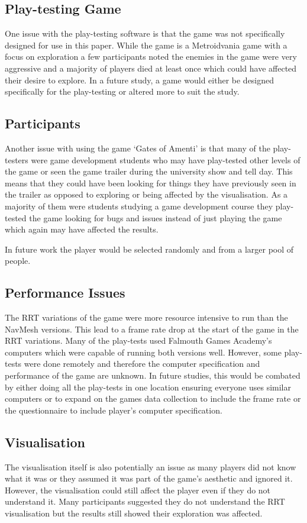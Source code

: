 \documentclass[journal]{IEEEtran}
\begin{document}
	\subsection{Play-testing Game} 
	One issue with the play-testing software is that the game was not specifically designed for use in this paper. While the game is a Metroidvania game with a focus on exploration a few participants noted the enemies in the game were very aggressive and a majority of players died at least once which could have affected their desire to explore. In a future study, a game would either be designed specifically for the play-testing or altered more to suit the study.  
	
	\subsection{Participants}
	Another issue with using the game `Gates of Amenti' is that many of the play-testers were game development students who may have play-tested other levels of the game or seen the game trailer during the university show and tell day. This means that they could have been looking for things they have previously seen in the trailer as opposed to exploring or being affected by the visualisation. As a majority of them were students studying a game development course they play-tested the game looking for bugs and issues instead of just playing the game which again may have affected the results.
	
	In future work the player would be selected randomly and from a larger pool of people.
	
	\subsection{Performance Issues}
	The RRT variations of the game were more resource intensive to run than the NavMesh versions. This lead to a frame rate drop at the start of the game in the RRT variations. 
	Many of the play-tests used Falmouth Games Academy's computers which were capable of running both versions well. However, some play-tests were done remotely and therefore the computer specification and performance of the game are unknown. In future studies, this would be combated by either doing all the play-tests in one location ensuring everyone uses similar computers or to expand on the games data collection to include the frame rate or the questionnaire to include player's computer specification.     
	
	\subsection{Visualisation}    
	The visualisation itself is also potentially an issue as many players did not know what it was or they assumed it was part of the game's aesthetic and ignored it. However, the visualisation could still affect the player even if they do not understand it.  Many participants suggested they do not understand the RRT visualisation but the results still showed their exploration was affected. 
	
\end{document}
